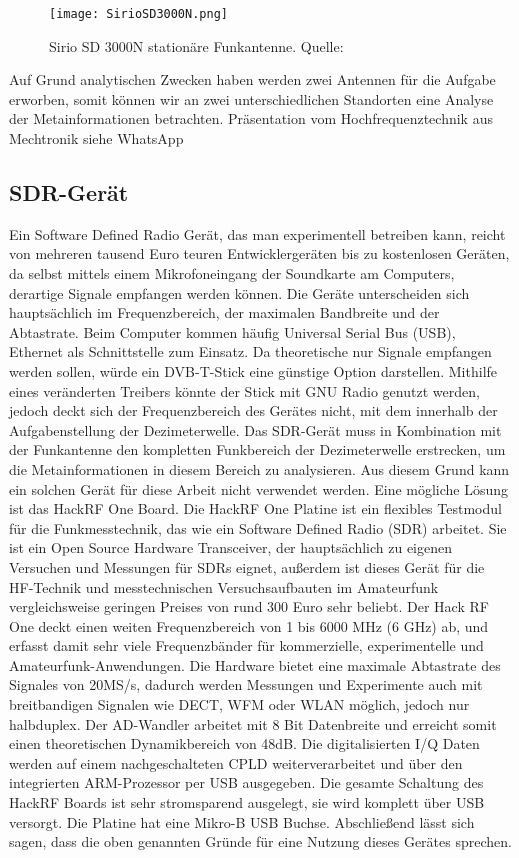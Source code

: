 \begin{figure}[H]
	\centering
	\texttt{[image: SirioSD3000N.png]}
	\caption[Sirio SD 3000N stationäre Funkantenne]{Sirio SD 3000N stationäre Funkantenne. Quelle: \cite{Funktechnik:2018}} 
	\label{Sirio SD 3000N Antenne}
\end{figure}

Auf Grund analytischen Zwecken haben werden zwei Antennen für die Aufgabe erworben, somit können wir an zwei unterschiedlichen Standorten eine Analyse der Metainformationen betrachten.
Präsentation vom Hochfrequenztechnik aus Mechtronik siehe WhatsApp

\subsection{SDR-Gerät}
Ein Software Defined Radio Gerät, das man experimentell betreiben kann, reicht von mehreren tausend Euro teuren Entwicklergeräten bis zu kostenlosen Geräten, da selbst mittels einem Mikrofoneingang der Soundkarte am Computers, derartige Signale empfangen werden können. Die Geräte unterscheiden sich hauptsächlich im Frequenzbereich, der maximalen Bandbreite und der Abtastrate. Beim Computer kommen häufig Universal Serial Bus (USB), Ethernet als Schnittstelle zum  Einsatz.
Da theoretische nur Signale empfangen werden sollen, würde ein DVB-T-Stick eine günstige Option darstellen. Mithilfe eines veränderten Treibers könnte der Stick mit GNU Radio genutzt werden, jedoch deckt sich der Frequenzbereich des Gerätes nicht, mit dem innerhalb der Aufgabenstellung der Dezimeterwelle.
Das SDR-Gerät muss in Kombination mit der Funkantenne den kompletten Funkbereich der Dezimeterwelle erstrecken, um die Metainformationen in diesem Bereich zu analysieren. Aus diesem Grund kann ein solchen Gerät für diese Arbeit nicht verwendet werden.
Eine mögliche Lösung ist das HackRF One Board. Die HackRF One Platine ist ein flexibles Testmodul für die Funkmesstechnik, das wie ein Software Defined Radio (SDR) arbeitet. Sie ist ein Open Source Hardware Transceiver, der hauptsächlich zu eigenen Versuchen und Messungen für SDRs eignet, außerdem ist dieses Gerät für die HF-Technik und messtechnischen Versuchsaufbauten im Amateurfunk vergleichsweise geringen Preises von rund 300 Euro sehr beliebt.
Der Hack RF One deckt einen weiten Frequenzbereich von 1 bis 6000 MHz (6 GHz) ab, und erfasst damit sehr viele Frequenzbänder für kommerzielle, experimentelle und Amateurfunk-Anwendungen. Die Hardware bietet eine maximale Abtastrate des Signales von 20MS/s, dadurch werden Messungen und Experimente auch mit breitbandigen Signalen wie DECT, WFM oder WLAN möglich, jedoch nur halbduplex. Der AD-Wandler arbeitet mit 8 Bit Datenbreite und erreicht somit einen theoretischen Dynamikbereich von 48dB. Die digitalisierten I/Q Daten werden auf einem nachgeschalteten CPLD weiterverarbeitet und über den integrierten ARM-Prozessor per USB ausgegeben. Die gesamte Schaltung des HackRF Boards ist sehr stromsparend ausgelegt, sie wird komplett über USB versorgt. Die Platine hat eine Mikro-B USB Buchse. Abschließend lässt sich sagen, dass die oben genannten Gründe für eine Nutzung dieses Gerätes sprechen.\cite{wimo:2018}

